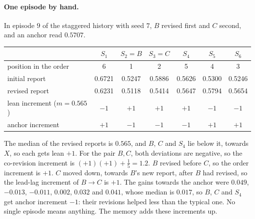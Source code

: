 \documentclass[11pt]{article}
\theoremstyle{definition}\newtheorem{definition}[theorem]{Definition}\newtheorem{remark}[theorem]{Remark}\newtheorem{example}[theorem]{Example}\newtheorem{problem}[theorem]{Open problem}\crefname{problem}{Problem}{Problems}
\begin{document}
\paragraph{One episode by hand.} In episode $9$ of the staggered history with seed $7$, $B$ revised first and $C$ second, and an anchor read $0.5707$.
\begin{center}\footnotesize
\begin{tabular}{@{}lcccccc@{}}
\toprule
 & $S_1$ & $S_2=B$ & $S_3=C$ & $S_4$ & $S_5$ & $S_6$\\\midrule
position in the order & 6 & 1 & 2 & 5 & 4 & 3\\
initial report & 0.6721 & 0.5247 & 0.5886 & 0.5626 & 0.5300 & 0.5246\\
revised report & 0.6231 & 0.5118 & 0.5414 & 0.5647 & 0.5794 & 0.5654\\
lean increment ($m=0.565$) & $-1$ & $+1$ & $+1$ & $+1$ & $-1$ & $-1$\\
anchor increment & $+1$ & $-1$ & $-1$ & $-1$ & $+1$ & $+1$\\
\bottomrule
\end{tabular}
\end{center}
The median of the revised reports is $0.565$, and $B$, $C$ and $S_4$ lie below it, towards $X$, so each gets lean $+1$. For the pair $B,C$, both deviations are negative, so the co-revision increment is $(+1)(+1)+\tfrac15=1.2$. $B$ revised before $C$, so the order increment is $+1$. $C$ moved down, towards $B$'s new report, after $B$ had revised, so the lead-lag increment of $B\to C$ is $+1$. The gains towards the anchor were $0.049$, $-0.013$, $-0.011$, $0.002$, $0.032$ and $0.041$, whose median is $0.017$, so $B$, $C$ and $S_4$ get anchor increment $-1$: their revisions helped less than the typical one. No single episode means anything. The memory adds these increments up.
\end{document}
